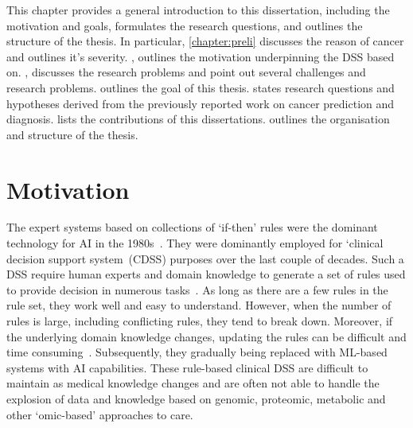 \hspace*{3.5mm} This chapter provides a general introduction to this dissertation, including the motivation and goals, formulates the research questions, and outlines the structure of the thesis. 
In particular, \cref{chapter:preli} discusses the reason of cancer and outlines it's severity. , outlines the motivation underpinning the DSS based on. , discusses the research problems and point out several challenges and research problems.  outlines the goal of this thesis.  states research questions and hypotheses derived from the previously reported work on cancer prediction and diagnosis.  lists the contributions of this dissertations.  outlines the organisation and structure of the thesis. 


\section{Motivation}\label{motivations}
The expert systems based on collections of `if-then' rules were the dominant technology for AI in the 1980s~\cite{davenport2019potential}. They were dominantly employed for `clinical decision support system~(CDSS) purposes over the last couple of decades. Such a DSS require human experts and domain knowledge to generate a set of rules used to provide decision in numerous tasks~\cite{davenport2019potential}. As long as there are a few rules in the rule set, they work well and easy to understand. However, when the number of rules is large, including conflicting rules, they tend to break down. Moreover, if the underlying domain knowledge changes, updating the rules can be difficult and time consuming~\cite{davenport2019potential}. Subsequently, they gradually being replaced with ML-based systems with AI capabilities. These rule-based clinical DSS are difficult to maintain as medical knowledge changes and are often not able to handle the explosion of data and knowledge based on genomic, proteomic, metabolic and other ‘omic-based’ approaches to care. 

